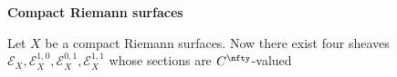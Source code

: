 \documentclass{amsart}
\begin{document}
\centerline{\bf\large{Compact Riemann surfaces}}

\bigskip

\noindent
Let $X$ be a compact Riemann surfaces.
Now there exist four sheaves
$\mathcal E_X,\mathcal E_X^{1,0},\mathcal E_X^{0,1},\mathcal E_X^{1,1}$
whose sections are $C^\nfty$-valued





\bigskip
\end{document}
